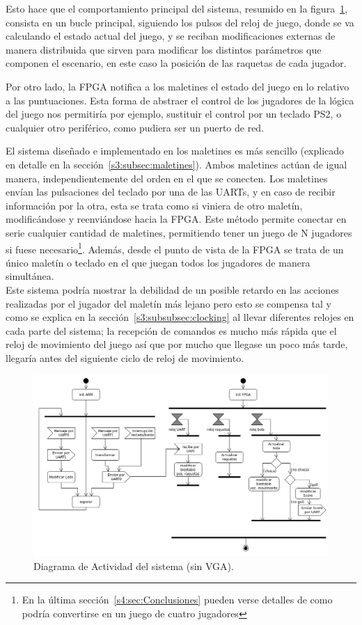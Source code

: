Esto hace que el comportamiento principal del sistema, resumido en la
figura~\ref{s2:fig:comportamiento}, consista en un bucle principal,
siguiendo los pulsos del reloj de juego, donde se va calculando el estado
actual del juego, y se reciban modificaciones externas de manera
distribuida que sirven para modificar los distintos parámetros que componen
el escenario, en este caso la posición de las raquetas de cada jugador.

Por otro lado, la FPGA notifica a los maletines el estado del juego en lo
relativo a las puntuaciones. Esta forma de abstraer el control de los
jugadores de la lógica del juego nos permitiría por ejemplo, sustituir
el control por un teclado PS2, o cualquier otro periférico, como pudiera
ser un puerto de red.

El sistema diseñado e implementado en los maletines es más sencillo
(explicado en detalle en la sección~\ref{s3:subsec:maletines}). Ambos
maletines actúan de igual manera, independientemente del orden en el que se
conecten. Los maletines envían las pulsaciones del teclado por una de las
UARTs, y en caso de recibir información por la otra, esta se trata como si
viniera de otro maletín, modificándose y reenviándose hacia la FPGA.  Este
método permite conectar en serie cualquier cantidad de maletines,
permitiendo tener un juego de N jugadores si fuese necesario\footnote{En la
  última sección~\ref{s4:sec:Conclusiones} pueden verse detalles de como
  podría convertirse en un juego de cuatro jugadores}. Además, desde el
punto de vista de la FPGA se trata de un único
maletín o teclado en el que juegan todos los jugadores de manera simultánea. \\

Este sistema podría mostrar la debilidad de un posible retardo en las
acciones realizadas por el jugador del maletín más lejano pero esto se
compensa tal y como se explica en la sección~\ref{s3:subsubsec:clocking} al llevar
diferentes relojes en cada parte del sistema; la recepción de comandos
es mucho más rápida que el reloj de movimiento del juego así que por
mucho que llegase un poco más tarde, llegaría antes del siguiente ciclo
de reloj de movimiento.

\begin{figure}[h]
  \centering
  \includegraphics[width=1.0\textwidth]{images/sistema.png}
  \caption{Diagrama de Actividad del sistema (sin VGA).}
  \label{s2:fig:comportamiento}
\end{figure}

